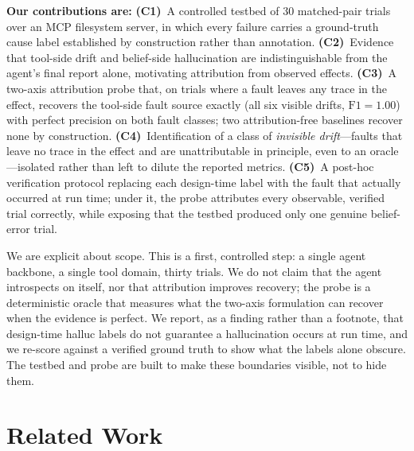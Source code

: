 \documentclass[runningheads]{llncs}
\begin{document}
\smallskip\noindent\textbf{Our contributions are:} \textbf{(C1)}~A controlled testbed of 30 matched-pair trials over an MCP filesystem server, in which every failure carries a ground-truth cause label established by construction rather than annotation. \textbf{(C2)}~Evidence that tool-side drift and belief-side hallucination are indistinguishable from the agent's final report alone, motivating attribution from observed effects. \textbf{(C3)}~A two-axis attribution probe that, on trials where a fault leaves any trace in the effect, recovers the tool-side fault source exactly (all six visible drifts, $\mathrm{F1}{=}1.00$) with perfect precision on both fault classes; two attribution-free baselines recover none by construction. \textbf{(C4)}~Identification of a class of \emph{invisible drift}---faults that leave no trace in the effect and are unattributable in principle, even to an oracle---isolated rather than left to dilute the reported metrics. \textbf{(C5)}~A post-hoc verification protocol replacing each design-time label with the fault that actually occurred at run time; under it, the probe attributes every observable, verified trial correctly, while exposing that the testbed produced only one genuine belief-error trial.

We are explicit about scope. This is a first, controlled step: a single agent backbone, a single tool domain, thirty trials. We do not claim that the agent introspects on itself, nor that attribution improves recovery; the probe is a deterministic oracle that measures what the two-axis formulation can recover when the evidence is perfect. We report, as a finding rather than a footnote, that design-time \textsf{halluc} labels do not guarantee a hallucination occurs at run time, and we re-score against a verified ground truth to show what the labels alone obscure. The testbed and probe are built to make these boundaries visible, not to hide them.

\section{Related Work}
\label{sec:related}
\end{document}
